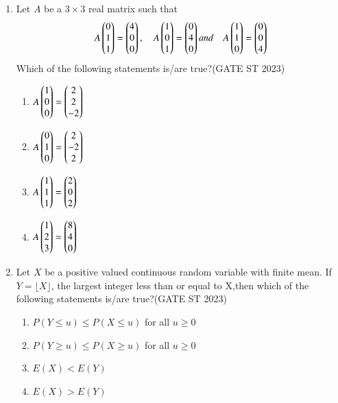 \documentclass[journal]{IEEEtran}
\begin{document}
\begin{enumerate}[label=\textbf{Q.\arabic*.}, start=11, align=left, itemsep=2em]
\item Let $A$ be a $3\times 3$ real matrix such that\[
A\begin{pmatrix}0\\1\\1\\\end{pmatrix} = \begin{pmatrix}4\\0\\0\\\end{pmatrix},\quad
A\begin{pmatrix}1\\0\\1\\\end{pmatrix} = \begin{pmatrix}0\\4\\0\\\end{pmatrix}and\quad
A\begin{pmatrix}1\\1\\0\\\end{pmatrix} = \begin{pmatrix}0\\0\\4\\\end{pmatrix}
\]
Which of the following statements is/are true?\hfill(GATE ST 2023)
\begin{enumerate}
\item $A\begin{pmatrix}1\\0\\0\\\end{pmatrix} = \begin{pmatrix}2\\2\\-2\\\end{pmatrix}$
\item $A\begin{pmatrix}0\\1\\0\\\end{pmatrix} = \begin{pmatrix}2\\-2\\2\\\end{pmatrix}$
\item $A\begin{pmatrix}1\\1\\1\\\end{pmatrix} = \begin{pmatrix}2\\0\\2\\\end{pmatrix}$
\item $A\begin{pmatrix}1\\2\\3\\\end{pmatrix} = \begin{pmatrix}8\\4\\0\\\end{pmatrix}$
\end{enumerate}

\item Let $X$ be a positive valued continuous random variable with finite mean. If $Y = \lfloor X \rfloor$, the largest integer less than or equal to X,then which of the following statements is/are true?\hfill(GATE ST 2023) 
\begin{enumerate}
\item $P(Y \le u) \le P(X \le u)$ for all $u \ge 0$
\item $P(Y \ge u) \le P(X \ge u)$ for all $u \ge 0$
\item $E(X) < E(Y)$
\item $E(X) > E(Y)$
\end{enumerate}


\end{enumerate}
\end{document}
